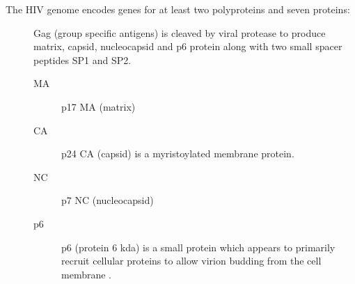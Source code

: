 \documentclass[../sherrill-Mix_thesis.tex]{subfiles}
\begin{document}
The HIV genome encodes genes for at least two polyproteins and seven proteins:\\ %
\begin{description}
	\item[\gag{}]
		Gag (group specific antigens) is cleaved by viral protease to produce matrix, capsid, nucleocapsid and p6 protein along with two small spacer peptides SP1 and SP2. 
		\begin{description}
			\item[MA]
				p17 MA (matrix)
			\item[CA]
				p24 CA (capsid) is a myristoylated membrane protein.
			\item[NC]
				p7 NC (nucleocapsid)
			\item[p6]
				p6 (protein 6 kda) is a small protein which appears to primarily recruit cellular proteins to allow virion budding from the cell membrane \citep{Veronese1987,Goettlinger1991,Strack2003}.
		\end{description}
			


\end{description}
\end{document}
